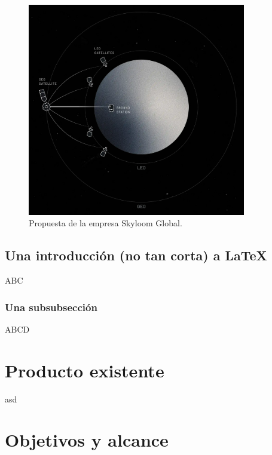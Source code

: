 \begin{figure}[H]
\centering
\includegraphics[width=0.85\textwidth]{./Figures/propuesta_skyloom.png}
\caption{Propuesta de la empresa Skyloom Global\protect\footnotemark.}
\label{fig:propSky}
\end{figure}


\subsection{Una introducción (no tan corta) a \LaTeX{}}

ABC

\subsubsection{Una subsubsección}

ABCD


\section{Producto existente}

asd



\section{Objetivos y alcance}

